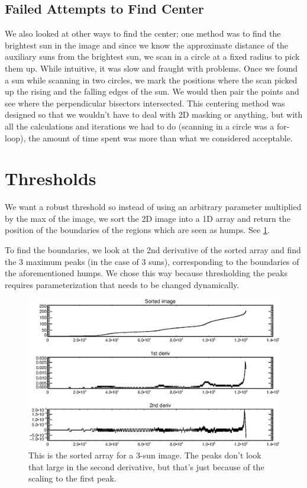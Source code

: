 \documentclass[10pt]{scrartcl}
\begin{document}
\subsection{Failed Attempts to Find Center} %
\label{sub:failed_attempts_to_find_center}
We also looked at other ways to find the center; one method was to find the brightest sun in the image and since we know the approximate distance of the auxiliary suns from the brightest sun, we scan in a circle at a fixed radius to pick them up. While intuitive, it was slow and fraught with problems. Once we found a sun while scanning in two circles, we mark the positions where the scan picked up the rising and the falling edges of the sun. We would then pair the points and see where the perpendicular bisectors intersected. This centering method was designed so that we wouldn't have to deal with 2D masking or anything, but with all the calculations and iterations we had to do (scanning in a circle was a for-loop), the amount of time spent was more than what we considered acceptable. 

\section{Thresholds} %
\label{sec:thresholds}
We want a robust threshold so instead of using an arbitrary parameter multiplied by the max of the image, we sort the 2D image into a 1D array and return the position of the boundaries of the regions which are seen as humps. See \cref{peaks}.

To find the boundaries, we look at the 2nd derivative of the sorted array and find the 3 maximum peaks (in the case of 3 suns), corresponding to the boundaries of the aforementioned humps. We chose this way because thresholding the peaks requires parameterization that needs to be changed dynamically. 

\begin{figure}[!ht]
   \includegraphics[width=.75\textwidth]{../plots_tables_images/sortedarray.eps}%
   \caption{This is the sorted array for a 3-sun image. The peaks don't look that large in the second derivative, but that's just because of the scaling to the first peak.}\label{peaks}
\end{figure}
\end{document}
